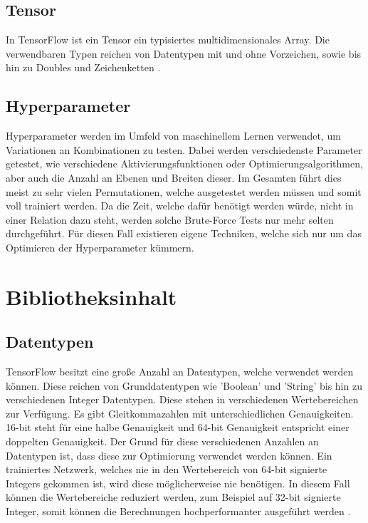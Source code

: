 \subsection{Tensor}

In TensorFlow ist ein Tensor ein typisiertes multidimensionales Array. 
Die verwendbaren Typen reichen von Datentypen mit und ohne Vorzeichen, sowie bis hin zu Doubles und Zeichenketten  \cite{wp2015tensorflow}. 

\subsection{Hyperparameter} 

Hyperparameter werden im Umfeld von maschinellem Lernen verwendet, um Variationen an Kombinationen zu testen. 
Dabei werden verschiedenste Parameter getestet, wie verschiedene Aktivierungsfunktionen oder Optimierungsalgorithmen, aber auch die Anzahl an Ebenen und Breiten dieser. 
Im Gesamten führt dies meist zu sehr vielen Permutationen, welche ausgetestet werden müssen und somit voll trainiert werden. 
Da die Zeit, welche dafür benötigt werden würde, nicht in einer Relation dazu steht, werden solche Brute-Force Tests nur mehr selten durchgeführt. 
Für diesen Fall existieren eigene Techniken, welche sich nur um das Optimieren der Hyperparameter kümmern. \cite{bishop2006pattern}

\section{Bibliotheksinhalt}

\subsection{Datentypen}

TensorFlow besitzt eine große Anzahl an Datentypen, welche verwendet werden können. 
Diese reichen von Grunddatentypen wie 'Boolean' und 'String' bis hin zu verschiedenen Integer Datentypen. 
Diese stehen in verschiedenen Wertebereichen zur Verfügung. 
Es gibt Gleitkommazahlen mit unterschiedlichen Genauigkeiten. 16-bit steht für eine halbe Genauigkeit und 64-bit Genauigkeit entspricht einer doppelten Genauigkeit.
Der Grund für diese verschiedenen Anzahlen an Datentypen ist, dass diese zur Optimierung verwendet werden können. 
Ein trainiertes Netzwerk, welches nie in den Wertebereich von 64-bit signierte Integers gekommen ist, wird diese möglicherweise nie benötigen. 
In diesem Fall können die Wertebereiche reduziert werden, zum Beispiel auf 32-bit signierte Integer, somit können die Berechnungen hochperformanter ausgeführt werden \cite{TensorFlow}. 

